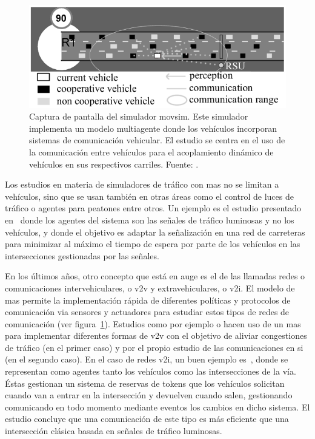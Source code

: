 \begin{figure}
	\centering
	\includegraphics{images/cooperative-traffic-movsim}
	\caption{Captura de pantalla del simulador \gls{movsim}. Este simulador implementa un modelo multiagente donde los vehículos incorporan sistemas de comunicación vehicular. El estudio se centra en el uso de la comunicación entre vehículos para el acoplamiento dinámico de vehículos en sus respectivos carriles. Fuente: \cite{Gu2015}.}
	\label{fig:cooperative-traffic-movsim}
\end{figure}

Los estudios en materia de simuladores de tráfico con \ac{mas} no se limitan a vehículos, sino que se usan también en otras áreas como el control de luces de tráfico o agentes para peatones entre otros. Un ejemplo es el estudio presentado en~\cite{Clymer2002} donde los agentes del sistema son las señales de tráfico luminosas y no los vehículos, y donde el objetivo es adaptar la señalización en una red de carreteras para minimizar al máximo el tiempo de espera por parte de los vehículos en las intersecciones gestionadas por las señales.

En los últimos años, otro concepto que está en auge es el de las llamadas redes o comunicaciones intervehiculares, o \ac{v2v} y extravehiculares, o \ac{v2i}. El modelo de \ac{mas} permite la implementación rápida de diferentes políticas y protocolos de comunicación via sensores y actuadores para estudiar estos tipos de redes de comunicación (ver figura~\ref{fig:cooperative-traffic-movsim}). Estudios como por ejemplo \cite{Shiose2001} o \cite{Galis2000} hacen uso de un \ac{mas} para implementar diferentes formas de \ac{v2v} con el objetivo de aliviar congestiones de tráfico (en el primer caso) y por el propio estudio de las comunicaciones en si (en el segundo caso). En el caso de redes \ac{v2i}, un buen ejemplo es~\cite{Dresner2004}, donde se representan como agentes tanto los vehículos como las intersecciones de la vía. Éstas gestionan un sistema de reservas de tokens que los vehículos solicitan cuando van a entrar en la intersección y devuelven cuando salen, gestionando  comunicando en todo momento mediante eventos los cambios en dicho sistema. El estudio concluye que una comunicación de este tipo es más eficiente que una intersección clásica basada en señales de tráfico luminosas.

